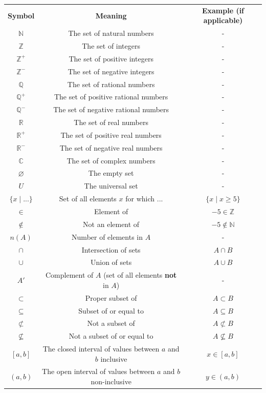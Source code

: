\documentclass[12pt, a4paper, titlepage, twoside]{article}
\newcommand*{\N}{\mathbb{N}}
\newcommand*{\Z}{\mathbb{Z}}
\newcommand*{\Q}{\mathbb{Q}}
\newcommand*{\R}{\mathbb{R}}
\newcommand*{\C}{\mathbb{C}}
\begin{document}
		{\centering
		\begin{longtable}{|c|c|c|} 
 			\hline
			\textbf{Symbol} & \textbf{Meaning} & \textbf{Example (if applicable)}\\
			\hhline{|=|=|=|}
			$\N$ & The set of natural numbers & -\\
			\hline
			$\Z$ & The set of integers & -\\
			\hline
			$\Z^+$ & The set of positive integers & -\\
			\hline
			$\Z^-$ & The set of negative integers & -\\
			\hline
			$\Q$ & The set of rational numbers & -\\
			\hline
			$\Q^+$ & The set of positive rational numbers & -\\
			\hline
			$\Q^-$ & The set of negative rational numbers & -\\
			\hline
			$\R$ & The set of real numbers & -\\
			\hline
			$\R^+$ & The set of positive real numbers & -\\
			\hline
			$\R^-$ & The set of negative real numbers & -\\
			\hline
			$\C$ & The set of complex numbers & -\\
			\hline
			$\varnothing$ & The empty set & -\\
			\hline
			$U$ & The universal set & -\\
			\hline
			$\{x \mid ...\}$ & Set of all elements $x$ for which $...$ & $\{x \mid x \geqslant 5\}$\\
			\hline
			$\in$ & Element of & $-5 \in \Z$\\
			\hline
			$\not\in$ & Not an element of & $-5 \not\in \N$\\
			\hline
			$n(A)$ & Number of elements in $A$ & -\\
			\hline
			$\cap$ & Intersection of sets & $A \cap B$\\
			\hline
			$\cup$ & Union of sets & $A \cup B$\\
			\hline
			$A'$ & \makecell{Complement of $A$ (set of all elements \\ \textbf{not} in $A$)} & -\\
			\hline
			$\subset$ & Proper subset of & $A \subset B$\\
			\hline
			$\subseteq$ & Subset of or equal to & $A \subseteq B$\\
			\hline
			$\not\subset$ & Not a subset of & $A \not\subset B$\\
			\hline
			$\not\subseteq$ & Not a subset of or equal to & $A \not\subseteq B$\\
			\hline
			$[a,b]$ & \makecell{The closed interval of values between\\ $a$ and $b$ inclusive} & $x \in [a,b]$\\
			\hline
			$(a,b)$ & \makecell{The open interval of values between\\ $a$ and $b$ non-inclusive} & $y \in (a,b)$\\
			\hline
		\end{longtable}}
	
\end{document}
